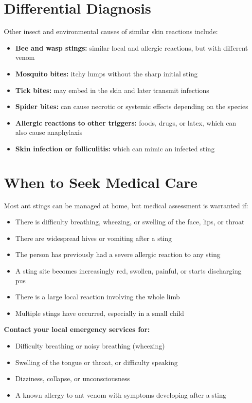 \section*{Differential Diagnosis}
Other insect and environmental causes of similar skin reactions include:

\begin{itemize}
    \item \textbf{Bee and wasp stings:} similar local and allergic reactions, but with different venom
    \item \textbf{Mosquito bites:} itchy lumps without the sharp initial sting
    \item \textbf{Tick bites:} may embed in the skin and later transmit infections
    \item \textbf{Spider bites:} can cause necrotic or systemic effects depending on the species
    \item \textbf{Allergic reactions to other triggers:} foods, drugs, or latex, which can also cause anaphylaxis
    \item \textbf{Skin infection or folliculitis:} which can mimic an infected sting
\end{itemize}

\section*{When to Seek Medical Care}
Most ant stings can be managed at home, but medical assessment is warranted if:

\begin{itemize}
    \item There is difficulty breathing, wheezing, or swelling of the face, lips, or throat
    \item There are widespread hives or vomiting after a sting
    \item The person has previously had a severe allergic reaction to any sting
    \item A sting site becomes increasingly red, swollen, painful, or starts discharging pus
    \item There is a large local reaction involving the whole limb
    \item Multiple stings have occurred, especially in a small child
\end{itemize}

\textbf{Contact your local emergency services for:}
\begin{itemize}
    \item Difficulty breathing or noisy breathing (wheezing)
    \item Swelling of the tongue or throat, or difficulty speaking
    \item Dizziness, collapse, or unconsciousness
    \item A known allergy to ant venom with symptoms developing after a sting
\end{itemize}

